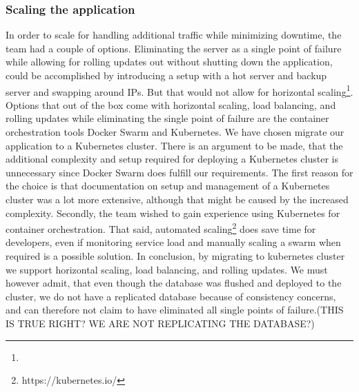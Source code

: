 \subsubsection{Scaling the application}
\label{subsubsec:scalingApp}
In order to scale for handling additional traffic while minimizing downtime, the team had a couple of options. Eliminating the server as a single point of failure while allowing for rolling updates out without shutting down the application, could be accomplished by introducing a setup with a hot server and backup server and swapping around IPs. But that would not allow for horizontal scaling\footnote{}.\\
Options that out of the box come with horizontal scaling, load balancing, and rolling updates while eliminating the single point of failure are the container orchestration tools Docker Swarm and Kubernetes. We have chosen migrate our application to a Kubernetes cluster. There is an argument to be made, that the additional complexity and setup required for deploying a Kubernetes cluster is unnecessary since Docker Swarm does fulfill our requirements. The first reason for the choice is that documentation on setup and management of a Kubernetes cluster was a lot more extensive, although that might be caused by the increased complexity. Secondly, the team wished to gain experience using Kubernetes for container orchestration. That said, automated scaling\footnote{https://kubernetes.io/} does save time for developers, even if monitoring service load and manually scaling a swarm when required is a possible solution. In conclusion, by migrating to kubernetes cluster we support horizontal scaling, load balancing, and rolling updates. We must however admit, that even though the database was flushed and deployed to the cluster, we do not have a replicated database because of consistency concerns, and can therefore not claim to have eliminated all single points of failure.(THIS IS TRUE RIGHT? WE ARE NOT REPLICATING THE DATABASE?)
